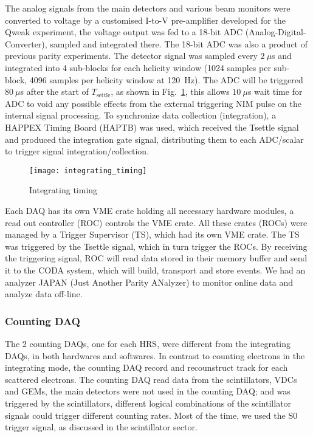 The analog signals from the main detectors and various beam monitors were converted 
to voltage by a customised I-to-V 
pre-amplifier developed for the Qweak experiment, the voltage output was fed
to a 18-bit ADC (Analog-Digital-Converter), sampled and integrated there. The
18-bit ADC was also a product of previous parity experiments. The detector signal was
sampled every $2\ \mu$s and integrated into 4 sub-blocks for each helicity window
(1024 samples per sub-block, 4096 samples per helicity window at 120~Hz).
The ADC will be triggered $80\ \mu$s after the start of $T_{\text{settle}}$, as shown
in Fig.~\ref{fig:integrating_timing}, this allows $10\ \mu$s wait time for 
ADC to void any possible effects from the external triggering NIM pulse on the 
internal signal processing. To synchronize data collection (integration), 
a HAPPEX Timing Board (HAPTB) was used, which received the Tsettle signal and
produced the integration gate signal, distributing them to each ADC/scalar to trigger
signal integration/collection.

\begin{figure}
    \centering
    \texttt{[image: integrating\_timing]}
    \caption{Integrating timing}
    \label{fig:integrating_timing}
\end{figure}

Each DAQ has its own VME crate holding all necessary hardware modules, a read 
out controller (ROC) controls the VME crate. All these crates (ROCs) were
managed by a Trigger Supervisor (TS), which had its own VME crate. The TS was
triggered by the Tsettle signal, which in turn trigger the ROCs.
By receiving the triggering signal, ROC will read data stored in their memory 
buffer and send it to the CODA system, 
which will build, transport and store events. We had an analyzer JAPAN (Just
Another Parity ANalyzer) to monitor online data and analyze data off-line.


\subsubsection{Counting DAQ}
The 2 counting DAQs, one for each HRS, were different from the integrating DAQs,
in both hardwares and softwares. In contrast to counting electrons in the integrating
mode, the counting DAQ record and recounstruct track for each scattered electrons.
The counting DAQ read data from the scintillators,
VDCs and GEMs, the main detectors were not used in the counting DAQ; and was
triggered by the scintillators, different logical combinations of the scintillator
signals could trigger different counting rates. Most of the time, we used the S0
trigger signal, as discussed in the scintillator sector.

